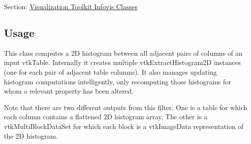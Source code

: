Section\-: \hyperlink{sec_vtkinfovis}{Visualization Toolkit Infovis Classes} \hypertarget{vtkwidgets_vtkxyplotwidget_Usage}{}\subsection{Usage}\label{vtkwidgets_vtkxyplotwidget_Usage}
This class computes a 2\-D histogram between all adjacent pairs of columns of an input vtk\-Table. Internally it creates multiple vtk\-Extract\-Histogram2\-D instances (one for each pair of adjacent table columns). It also manages updating histogram computations intelligently, only recomputing those histograms for whom a relevant property has been altered.

Note that there are two different outputs from this filter. One is a table for which each column contains a flattened 2\-D histogram array. The other is a vtk\-Multi\-Block\-Data\-Set for which each block is a vtk\-Image\-Data representation of the 2\-D histogram.

